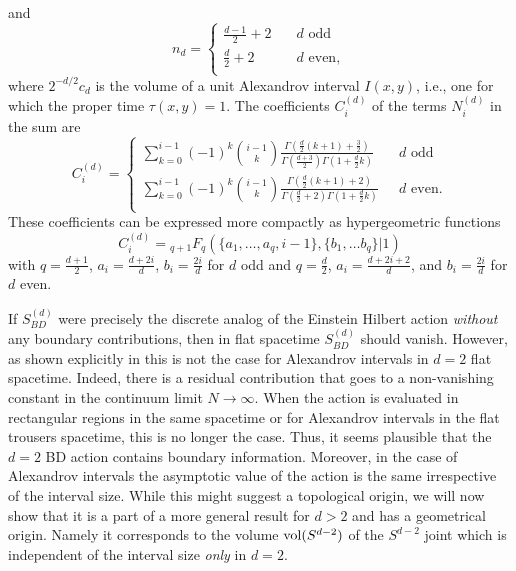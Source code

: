 \documentclass[12pt]{article}
\begin{document}
and
\begin{equation} 
n_d = 
\begin{cases} 
\frac{d-1}{2} + 2  \quad & d\mathrm{ \, \, odd}\\ 
\frac{d}{2} + 2  \quad &d\mathrm{ \, \,  even,}\\ 
\end{cases} 
\end{equation} 
where  $2^{-d/2} c_d$ is the volume of a unit Alexandrov interval $I (x,y)$, i.e., one for which the proper time $\tau (x,y)=1$. 
The coefficients $C_i^{ (d)}$ of the terms $N_i^{ (d)}$ in the sum are
\begin{equation}
\label{cid}
 C_i^{ (d)}= 
\begin{cases} 
\displaystyle\sum_{k=0}^{i-1} (-1)^k\binom{i-1}{k} \frac{\Gamma\left(\frac{d}2(k+1)+\frac32\right)}{\Gamma\left (\frac{d+3}{2}\right) \Gamma\left (1+\frac{d}2k\right)}  \quad  &d\mathrm{ \, \, odd}\\ 
\displaystyle\sum_{k=0}^{i-1} (-1)^k\binom{i-1}{k} \frac{\Gamma\left (\frac{d}2 (k+1)+2\right)}{\Gamma\left (\frac{d}2+2\right) \Gamma\left (1+\frac{d}2k\right)}  &d \mathrm{ \, \,  even.}\\ 
\end{cases} 
\end{equation} 
These coefficients can be expressed more compactly as hypergeometric functions 
\begin{equation}
C_i^{(d)}={}_{q+1}F_{q} (\{ a_1, \ldots, a_q, i-1\}, \{b_1, \ldots b_q \} |1)
\label{chyp} 
\end{equation} 
with $q=\frac{d+1}{2}$, $a_i=\frac{d+2i}{d}$, $b_i=\frac{2i}{d}$ for $d$ odd and $q=\frac{d}{2}$, $a_i=\frac{d+2i+2}{d}$, and $b_i=\frac{2i}{d}$  for $d$ even.  


If $S_{BD}^{ (d)}$ were precisely the discrete analog of the Einstein Hilbert action {\it without} any boundary contributions, then in flat spacetime  $S_{BD}^{ (d)}$ should  vanish. However, as shown explicitly in \cite{bbdtwo} this is not the case for Alexandrov intervals in $d=2$  flat spacetime. Indeed, there is a residual contribution that goes to a non-vanishing constant in the continuum limit $N\rightarrow \infty$.  When the action is evaluated in rectangular regions in the same spacetime or for Alexandrov intervals in  the flat trousers spacetime, this is no longer the case. Thus, it seems plausible that the $d=2$ BD action contains boundary information. Moreover, in the case of Alexandrov intervals the asymptotic value of the action is the same  irrespective of the interval size. While this might suggest a  topological origin, we will now show that it is a part of a more general  result for $d>2$ and  has a geometrical origin. Namely it corresponds to the volume  $\mathrm{vol} (S^{d-2})$ of the $S^{d-2}$ joint which is independent of the interval size {\it only} in $d=2$.   
\end{document}
